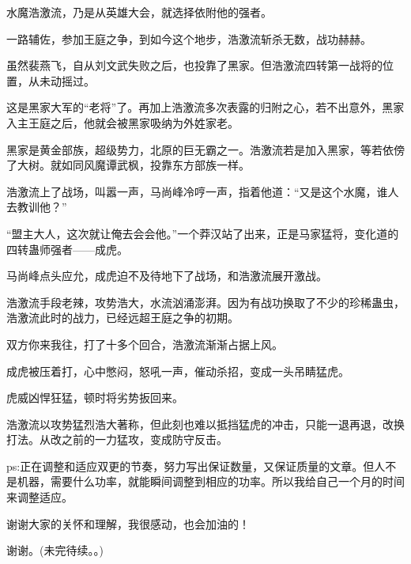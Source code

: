 \begin{this_body}
水魔浩激流，乃是从英雄大会，就选择依附他的强者。

一路辅佐，参加王庭之争，到如今这个地步，浩激流斩杀无数，战功赫赫。

虽然裴燕飞，自从刘文武失败之后，也投靠了黑家。但浩激流四转第一战将的位置，从未动摇过。

这是黑家大军的“老将”了。再加上浩激流多次表露的归附之心，若不出意外，黑家入主王庭之后，他就会被黑家吸纳为外姓家老。

黑家是黄金部族，超级势力，北原的巨无霸之一。浩激流若是加入黑家，等若依傍了大树。就如同风魔谭武枫，投靠东方部族一样。

浩激流上了战场，叫嚣一声，马尚峰冷哼一声，指着他道：“又是这个水魔，谁人去教训他？”

“盟主大人，这次就让俺去会会他。”一个莽汉站了出来，正是马家猛将，变化道的四转蛊师强者——成虎。

马尚峰点头应允，成虎迫不及待地下了战场，和浩激流展开激战。

浩激流手段老辣，攻势浩大，水流汹涌澎湃。因为有战功换取了不少的珍稀蛊虫，浩激流此时的战力，已经远超王庭之争的初期。

双方你来我往，打了十多个回合，浩激流渐渐占据上风。

成虎被压着打，心中憋闷，怒吼一声，催动杀招，变成一头吊睛猛虎。

虎威凶悍狂猛，顿时将劣势扳回来。

浩激流以攻势猛烈浩大著称，但此刻也难以抵挡猛虎的冲击，只能一退再退，改换打法。从改之前的一力猛攻，变成防守反击。

ps:正在调整和适应双更的节奏，努力写出保证数量，又保证质量的文章。但人不是机器，需要什么功率，就能瞬间调整到相应的功率。所以我给自己一个月的时间来调整适应。

谢谢大家的关怀和理解，我很感动，也会加油的！

谢谢。(未完待续。。)

\end{this_body}

